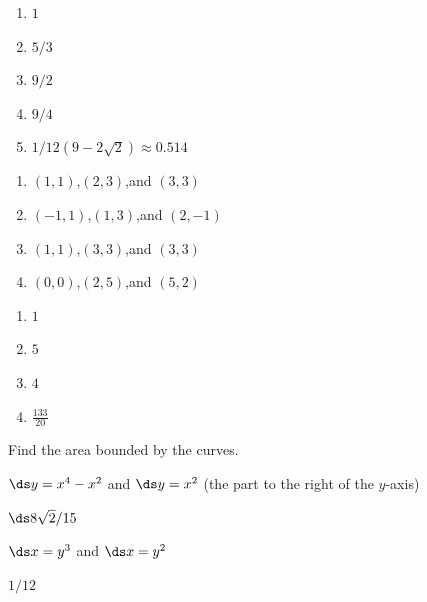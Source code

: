 \begin{multicols}{2}[]
\begin{enumialphparenastyle}
\begin{ex}
\begin{enumerate}
{\begin{minipage}{\textwidth}
\end{minipage}}
\end{enumerate}		

\begin{sol}
\begin{enumerate}
\item {$1$}
\item {$5/3$}
\item {$9/2$}
\item {$9/4$}
\item {$1/12(9-2\sqrt{2})\approx 0.514$}
\end{enumerate}		
\end{sol}


\end{ex}


\begin{ex}
\begin{enumerate}
\item {$(1,1)$,\quad $(2,3)$,\quad and \quad $(3,3)$}
\item {$(-1,1)$,\quad $(1,3)$,\quad and \quad $(2,-1)$}
\item {$(1,1)$,\quad $(3,3)$,\quad and \quad $(3,3)$}
\item {$(0,0)$,\quad $(2,5)$,\quad and \quad $(5,2)$}
\end{enumerate}

\begin{sol}
\begin{enumerate}
\item $ 1 $
\item $ 5 $
\item $ 4 $
\item $ \frac{133}{20} $
\end{enumerate}
\end{sol}

\end{ex}


Find the area bounded by the curves.

\begin{ex}
 $\ds y=x^4-x^2$ and $\ds y=x^2$ (the part to the right of the $y$-axis)
\begin{sol}
 $\ds 8\sqrt2/15$
\end{sol}
\end{ex}

\begin{ex}
 $\ds x=y^3$ and $\ds x=y^2$
\begin{sol}
 $1/12$
\end{sol}
\end{ex}


\end{enumialphparenastyle}
\end{multicols}
